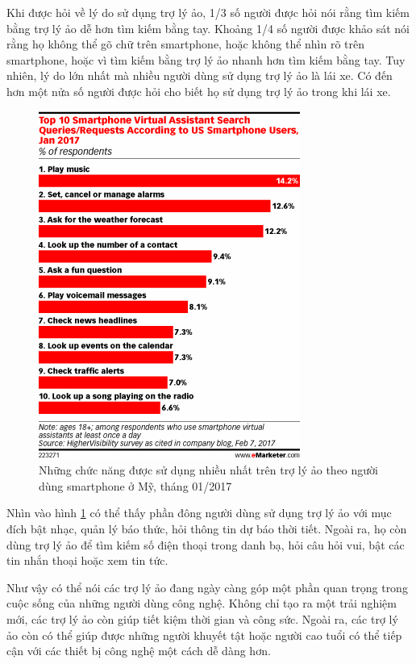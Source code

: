 Khi được hỏi về lý do sử dụng trợ lý ảo, 1/3 số người được hỏi nói rằng tìm kiếm bằng trợ lý ảo dễ hơn tìm kiếm bằng tay. Khoảng 1/4 số người được khảo sát nói rằng họ không thể gõ chữ trên smartphone, hoặc không thể nhìn rõ trên smartphone, hoặc vì tìm kiếm bằng trợ lý ảo nhanh hơn tìm kiếm bằng tay. Tuy nhiên, lý do lớn nhất mà nhiều người dùng sử dụng trợ lý ảo là lái xe. Có đến hơn một nửa số người được hỏi cho biết họ sử dụng trợ lý ảo trong khi lái xe.

\begin{figure}[h]
    \centering
    \includegraphics[scale=1]{emarketer_2}
    \caption[Những chức năng được sử dụng nhiều nhất trên trợ lý ảo]{Những chức năng được sử dụng nhiều nhất trên trợ lý ảo theo người dùng smartphone ở Mỹ, tháng 01/2017\cite{emarketerreport}}
    \label{fig:c1_emarketer_2}
\end{figure}

Nhìn vào hình \ref{fig:c1_emarketer_2} có thể thấy phần đông người dùng sử dụng trợ lý ảo với mục đích bật nhạc, quản lý báo thức, hỏi thông tin dự báo thời tiết. Ngoài ra, họ còn dùng trợ lý ảo để tìm kiếm số điện thoại trong danh bạ, hỏi câu hỏi vui, bật các tin nhắn thoại hoặc xem tin tức.

Như vậy có thể nói các trợ lý ảo đang ngày càng góp một phần quan trọng trong cuộc sống của những người dùng công nghệ. Không chỉ tạo ra một trải nghiệm mới, các trợ lý ảo còn giúp tiết kiệm thời gian và công sức. Ngoài ra, các trợ lý ảo còn có thể giúp được những người khuyết tật hoặc người cao tuổi có thể tiếp cận với các thiết bị công nghệ một cách dễ dàng hơn.

